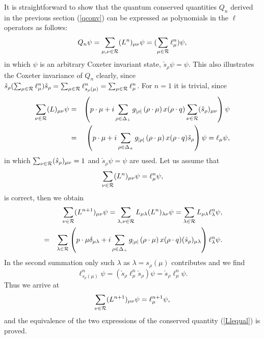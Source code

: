 \documentclass[a4paper,12pt]{article}
\begin{document}
It is straightforward to show that the quantum conserved quantities
\(Q_n\) derived in the previous section (\ref{qconv}) can be expressed
as polynomials in
 the \(\ell\) operators as follows:
\begin{equation}
   Q_n\psi=\sum_{\mu,\nu\in{\cal R}}(L^n)_{\mu\nu}\psi=
   (\sum_{\mu\in{\cal R}}\ell_{\mu}^n)\psi,
   \label{Llequal}
\end{equation}
in which \(\psi\) is an arbitrary Coxeter invariant state,
\(\check{s}_{\rho}\psi=\psi\).
This also illustrates the Coxeter invariance of \(Q_n\) clearly, since
\(\check{s}_{\rho}(\sum_{\mu\in{\cal R}}\ell_{\mu}^n)\check{s}_{\rho}
=\sum_{\mu\in{\cal R}}\ell_{{s}_{\rho}(\mu)}^n=\sum_{\mu\in{\cal
R}}\ell_{\mu}^n\). For \(n=1\) it is trivial, since
\begin{eqnarray}
   \sum_{\nu\in{\cal R}}(L)_{\mu\nu}\psi&=&
   \left(p\cdot\mu+i
   \sum_{\rho\in\Delta_{+}}g_{|\rho|}
      \,(\rho\cdot\mu)\,x(\rho\cdot
   q)\sum_{\nu\in{\cal R}}(\hat{s}_{\rho})_{\mu\nu}\right)\psi
   \nonumber\\
   &=&\left(p\cdot\mu+i
   \sum_{\rho\in\Delta_{+}}g_{|\rho|}
      \,(\rho\cdot\mu)\,x(\rho\cdot
   q)\check{s}_{\rho}\right)\psi=\ell_{\mu}\psi,
\end{eqnarray}
in which \(\sum_{\nu\in{\cal R}}(\hat{s}_{\rho})_{\mu\nu}=1\) and
\(\check{s}_{\rho}\psi=\psi\) are used.
Let us assume that
\begin{equation}
\sum_{\nu\in{\cal R}}(L^n)_{\mu\nu}\psi=
\ell_{\mu}^n\psi,
\end{equation}
is correct, then we obtain
\begin{eqnarray*}
   &&\sum_{\nu\in{\cal R}}(L^{n+1})_{\mu\nu}\psi=
   \sum_{\lambda, \nu\in{\cal R}}L_{\mu\lambda}(L^{n})_{\lambda\nu}\psi=
   \sum_{\lambda\in{\cal
   R}}L_{\mu\lambda}\ell_{\lambda}^n\psi,\\
   &=&\sum_{\lambda\in{\cal R}}\left(
   p\cdot\mu\delta_{\mu\lambda}+i
   \sum_{\rho\in\Delta_{+}}g_{|\rho|}
      \,(\rho\cdot\mu)\,x(\rho\cdot
   q)(\hat{s}_{\rho})_{\mu\lambda}
   \right)\ell_{\lambda}^n\psi.
\end{eqnarray*}
In the second summation only such \(\lambda\) as \(\lambda=s_{\rho}(\mu)\)
contributes and we find
\[
   \ell_{s_{\rho}(\mu)}^n\psi=(\check{s}_{\rho}
   \ell_{\mu}^n\check{s}_{\rho})\psi
   =\check{s}_{\rho}\ell_{\mu}^n\psi.
\]
Thus we arrive at
\begin{equation}
   \sum_{\nu\in{\cal R}}(L^{n+1})_{\mu\nu}\psi=
   \ell_{\mu}^{n+1}\psi,
\end{equation}
and the equivalence of the two expressions of the conserved
quantity (\ref{Llequal}) is proved.
\end{document}
